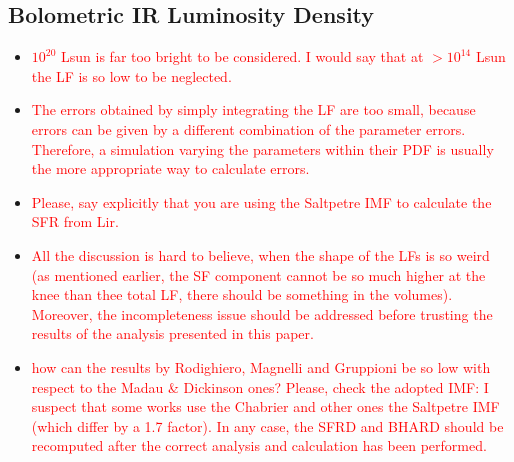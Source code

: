 \subsection{Bolometric IR Luminosity Density} \label{Sec: IR Density}
\begin{itemize}

    \item \textcolor{red}{$10^20$ Lsun is far too bright to be considered. I would say that at $>10^14$ Lsun the LF is so low to be neglected.}
    
    \item \textcolor{red}{The errors obtained by simply integrating the LF are too small, because errors can be given by a different combination of the parameter errors. Therefore, a simulation varying the parameters within their PDF is usually the more appropriate way to calculate errors.}
    
    \item \textcolor{red}{Please, say explicitly that you are using the Saltpetre IMF to calculate the SFR from Lir.}
    
    \item \textcolor{red}{All the discussion is hard to believe, when the shape of the LFs is so weird (as mentioned earlier, the SF component cannot be so much higher at the knee than thee total LF, there should be something in the volumes). Moreover, the incompleteness issue should be addressed before trusting the results of the analysis presented in this paper.}

    \item \textcolor{red}{how can the results by Rodighiero, Magnelli and Gruppioni be so low with respect to the Madau \& Dickinson ones? Please, check the adopted IMF: I suspect that some works use the Chabrier and other ones the Saltpetre IMF (which differ by a 1.7 factor). In any case, the SFRD and BHARD should be recomputed after the correct analysis and calculation has been performed.}
\end{itemize}

